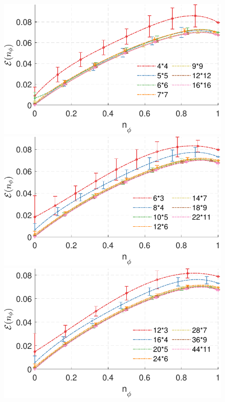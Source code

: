 \begin{frame}
\begin{figure}
    \centering
    \begin{minipage}[c]{.45\textwidth}
        \includegraphics[width = 1\textwidth]{figures/band_extrapolation_1.pdf}
    \end{minipage}
        \begin{minipage}[c]{.45\textwidth}
        \includegraphics[width = 1\textwidth]{figures/band_extrapolation_2.pdf}
    \end{minipage}
        \begin{minipage}[c]{.45\textwidth}
        \includegraphics[width = 1\textwidth]{figures/band_extrapolation_4.pdf}

\end{minipage}
\end{figure}
\end{frame}

